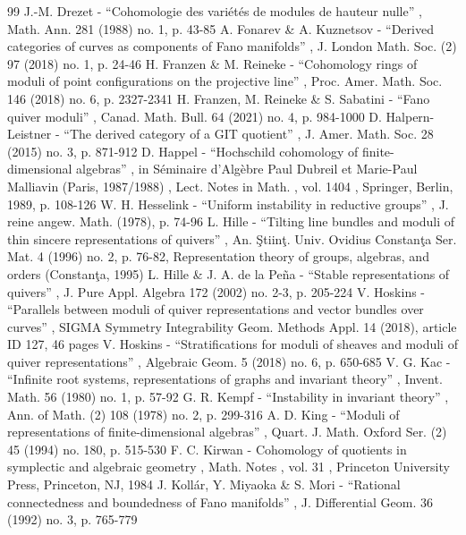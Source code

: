 \documentclass[11pt]{article}
\theoremstyle{plain}
\theoremstyle{definition}
\begin{document}
\begin{thebibliography}{99}
 J.-M. Drezet - “Cohomologie des variétés de modules de hauteur nulle” , Math. Ann. 281 (1988) no. 1, p. 43-85
 A. Fonarev \& A. Kuznetsov - “Derived categories of curves as components of Fano manifolds” , J. London Math. Soc. (2) 97 (2018) no. 1, p. 24-46
 H. Franzen \& M. Reineke - “Cohomology rings of moduli of point configurations on the projective line” , Proc. Amer. Math. Soc. 146 (2018) no. 6, p. 2327-2341
 H. Franzen, M. Reineke \& S. Sabatini - “Fano quiver moduli” , Canad. Math. Bull. 64 (2021) no. 4, p. 984-1000
 D. Halpern-Leistner - “The derived category of a GIT quotient” , J. Amer. Math. Soc. 28 (2015) no. 3, p. 871-912
 D. Happel - “Hochschild cohomology of finite-dimensional algebras” , in Séminaire d’Algèbre Paul Dubreil et Marie-Paul Malliavin (Paris, 1987/1988) , Lect. Notes in Math. , vol. 1404 , Springer, Berlin, 1989, p. 108-126
 W. H. Hesselink - “Uniform instability in reductive groups” , J. reine angew. Math. (1978), p. 74-96
 L. Hille - “Tilting line bundles and moduli of thin sincere representations of quivers” , An. Ştiinţ. Univ. Ovidius Constanţa Ser. Mat. 4 (1996) no. 2, p. 76-82, Representation theory of groups, algebras, and orders (Constanţa, 1995)
 L. Hille \& J. A. de la Peña - “Stable representations of quivers” , J. Pure Appl. Algebra 172 (2002) no. 2-3, p. 205-224
 V. Hoskins - “Parallels between moduli of quiver representations and vector bundles over curves” , SIGMA Symmetry Integrability Geom. Methods Appl. 14 (2018), article ID 127, 46 pages
 V. Hoskins - “Stratifications for moduli of sheaves and moduli of quiver representations” , Algebraic Geom. 5 (2018) no. 6, p. 650-685
 V. G. Kac - “Infinite root systems, representations of graphs and invariant theory” , Invent. Math. 56 (1980) no. 1, p. 57-92
 G. R. Kempf - “Instability in invariant theory” , Ann. of Math. (2) 108 (1978) no. 2, p. 299-316
 A. D. King - “Moduli of representations of finite-dimensional algebras” , Quart. J. Math. Oxford Ser. (2) 45 (1994) no. 180, p. 515-530
 F. C. Kirwan - Cohomology of quotients in symplectic and algebraic geometry , Math. Notes , vol. 31 , Princeton University Press, Princeton, NJ, 1984
 J. Kollár, Y. Miyaoka \& S. Mori - “Rational connectedness and boundedness of Fano manifolds” , J. Differential Geom. 36 (1992) no. 3, p. 765-779

\end{thebibliography}
\end{document}
